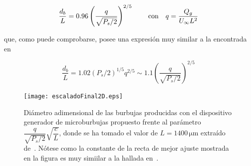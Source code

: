 \begin{equation}
\dfrac{d_{b}}{L} = 0.96\left(\dfrac{q}{\sqrt{P_{s}/2}}\right)^{2/5}\,\qquad \mathrm{con}\quad q = \dfrac{Q_{g}}{U_{\infty}L^{2}}
\LABEQ{leyEscala2D}
\end{equation}

que, como puede comprobarse, posee una expresión muy similar a la encontrada  en~\cite{Evangelio2015}

\begin{displaymath}
\dfrac{d_{b}}{L} = 1.02\left(P_{s}/2\right)^{1/5}q^{2/5} \sim 1.1\left(\dfrac{q}{\sqrt{P_{s}/2}}\right)^{2/5}
\end{displaymath}



\begin{figure}
\centering
\texttt{[image: escaladoFinal2D.eps]}
\caption{Diámetro adimensional de las burbujas producidas con el dispositivo generador de microburbujas propuesto frente al parámetro $\dfrac{q}{\sqrt{P_{s}/2}}\sqrt{\dfrac{c}{L}}$, donde se ha tomado el valor de $L = 1400\,\mathrm{\mu m}$ extraído de~\cite{Evangelio2015}. Nótese como la constante de la recta de mejor ajuste mostrada en la figura es muy simiilar a la hallada en~\cite{Evangelio2015}.}
\end{figure}




